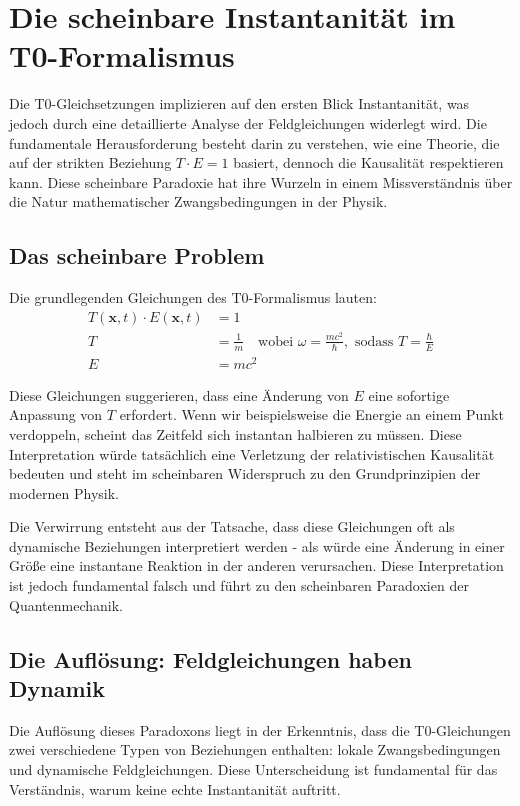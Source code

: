 \documentclass[12pt,a4paper]{article}
\begin{document}
	\section{Die scheinbare Instantanität im T0-Formalismus}
	
	Die T0-Gleichsetzungen implizieren auf den ersten Blick Instantanität, was jedoch durch eine detaillierte Analyse der Feldgleichungen widerlegt wird. Die fundamentale Herausforderung besteht darin zu verstehen, wie eine Theorie, die auf der strikten Beziehung $T \cdot E = 1$ basiert, dennoch die Kausalität respektieren kann. Diese scheinbare Paradoxie hat ihre Wurzeln in einem Missverständnis über die Natur mathematischer Zwangsbedingungen in der Physik.
	
	\subsection{Das scheinbare Problem}
	
	Die grundlegenden Gleichungen des T0-Formalismus lauten:
	\begin{align}
		T(\mathbf{x},t) \cdot E(\mathbf{x},t) &= 1 \label{eq:TE_constraint} \\
		T &= \frac{1}{m} \quad \text{wobei } \omega = \frac{mc^2}{\hbar}, \text{ sodass } T = \frac{\hbar}{E} \label{eq:T_definition} \\
		E &= mc^2 \label{eq:E_definition}
	\end{align}
	
	Diese Gleichungen suggerieren, dass eine Änderung von $E$ eine sofortige Anpassung von $T$ erfordert. Wenn wir beispielsweise die Energie an einem Punkt verdoppeln, scheint das Zeitfeld sich instantan halbieren zu müssen. Diese Interpretation würde tatsächlich eine Verletzung der relativistischen Kausalität bedeuten und steht im scheinbaren Widerspruch zu den Grundprinzipien der modernen Physik.
	
	Die Verwirrung entsteht aus der Tatsache, dass diese Gleichungen oft als dynamische Beziehungen interpretiert werden - als würde eine Änderung in einer Größe eine instantane Reaktion in der anderen verursachen. Diese Interpretation ist jedoch fundamental falsch und führt zu den scheinbaren Paradoxien der Quantenmechanik.
	
	\subsection{Die Auflösung: Feldgleichungen haben Dynamik}
	
	Die Auflösung dieses Paradoxons liegt in der Erkenntnis, dass die T0-Gleichungen zwei verschiedene Typen von Beziehungen enthalten: lokale Zwangsbedingungen und dynamische Feldgleichungen. Diese Unterscheidung ist fundamental für das Verständnis, warum keine echte Instantanität auftritt.
	
\end{document}
